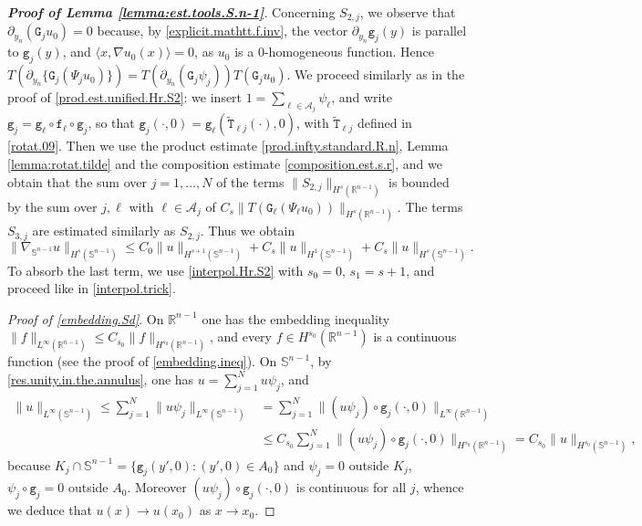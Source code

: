 \documentclass[10pt,reqno,a4paper]{article}
\numberwithin{equation}{section}
\theoremstyle{plain}
\theoremstyle{definition}
\newcommand{\R}{{\mathbb R}}
\renewcommand{\S}{{\mathbb S}}
\newcommand{\mA}{\mathcal{A}}
\newcommand{\la}{\langle}
\newcommand{\ra}{\rangle}
\newcommand{\pa}{\partial}
\newcommand{\grad}{\nabla}
\begin{document}
\begin{proof}[\textbf{Proof of Lemma \ref{lemma:est.tools.S.n-1}}]
Concerning $S_{2,j}$, we observe that $\pa_{y_n} (\mathtt G_j u_0) = 0$ 
because, by \eqref{explicit.mathtt.f.inv},  
the vector $\pa_{y_n} \mathtt g_j(y)$ is parallel to $\mathtt g_j(y)$, 
and $\la x, \grad u_0(x) \ra = 0$, as $u_0$ is a $0$-homogeneous function. 
Hence $T( \pa_{y_n} \{ \mathtt G_j (\Psi_j u_0) \}) 
= T ( \pa_{y_n} ( \mathtt G_j \psi_j)) T (\mathtt G_j u_0)$. 
We proceed similarly as in the proof of \eqref{prod.est.unified.Hr.S2}: 
we insert $1 = \sum_{\ell \in \mA_j} \psi_\ell$, 
and write $\mathtt g_j = \mathtt g_\ell \circ \mathtt f_\ell \circ \mathtt g_j$, 
so that $\mathtt g_j (\cdot, 0) = \mathtt g_\ell (\tilde{\mathtt T}_{\ell j} (\cdot), 0)$, 
with $\tilde{\mathtt T}_{\ell j}$ defined in \eqref{rotat.09}. 
Then we use the product estimate \eqref{prod.infty.standard.R.n}, 
Lemma \ref{lemma:rotat.tilde} and the composition estimate 
\eqref{composition.est.s.r}, and we obtain that 
the sum over $j=1, \ldots, N$ of the terms $\| S_{2,j} \|_{H^s(\R^{n-1})}$ 
is bounded by the sum over $j, \ell$ with $\ell \in \mA_j$ 
of $C_s \| T ( \mathtt G_\ell ( \Psi_\ell u_0) ) \|_{H^s(\R^{n-1})}$.
The terms $S_{3,j}$ are estimated similarly as $S_{2,j}$. 
Thus we obtain 
\[
\| \grad_{\S^{n-1}} u \|_{H^s(\S^{n-1})} 
\leq C_0 \| u \|_{H^{s+1}(\S^{n-1})} + C_s \| u \|_{H^1(\S^{n-1})}
+ C_s \| u \|_{H^s(\S^{n-1})}.
\]
To absorb the last term, we use \eqref{interpol.Hr.S2} with $s_0 = 0$, $s_1 = s+1$, 
and proceed like in \eqref{interpol.trick}. 


\emph{Proof of \eqref{embedding.Sd}}. 
On $\R^{n-1}$ one has the embedding inequality 
$\| f \|_{L^\infty(\R^{n-1})} \leq C_{s_0} \| f \|_{H^{s_0}(\R^{n-1})}$, 
and every $f \in H^{s_0}(\R^{n-1})$ is a continuous function 
(see the proof of \eqref{embedding.ineq}).
On $\S^{n-1}$, by \eqref{res.unity.in.the.annulus}, one has $u = \sum_{j=1}^N u \psi_j$, 
and 
\begin{align*}
\| u \|_{L^\infty(\S^{n-1})} 
\leq \sum_{j=1}^N \| u \psi_j \|_{L^\infty(\S^{n-1})}
& = \sum_{j=1}^N \| (u \psi_j) \circ \mathtt g_j(\cdot,0) \|_{L^\infty(\R^{n-1})}
\\ 
& \leq C_{s_0} \sum_{j=1}^N \| (u \psi_j) \circ \mathtt g_j(\cdot,0) \|_{H^{s_0}(\R^{n-1})}
= C_{s_0} \| u \|_{H^{s_0}(\S^{n-1})},
\end{align*}
because $K_j \cap \S^{n-1} = \{ \mathtt g_j(y',0) : (y',0) \in A_0 \}$ 
and $\psi_j = 0$ outside $K_j$, 
$\psi_j \circ \mathtt g_j = 0$ outside $A_0$.  
Moreover $(u \psi_j) \circ \mathtt{g}_j(\cdot, 0)$ is continuous for all $j$, 
whence we deduce that $u(x) \to u(x_0)$ as $x \to x_0$. 
\end{proof}
\end{document}
